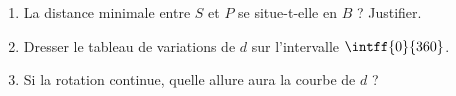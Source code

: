 \begin{exo}{}
	\begin{enumerate}
		\item La distance minimale entre $S$ et $P$ se situe-t-elle en $B$ ? Justifier.
		\item Dresser le tableau de variations de $d$ sur l'intervalle $\intff{0}{360}$.
		\item Si la rotation continue, quelle allure aura la courbe de $d$ ?
	\end{enumerate}

\end{exo}
